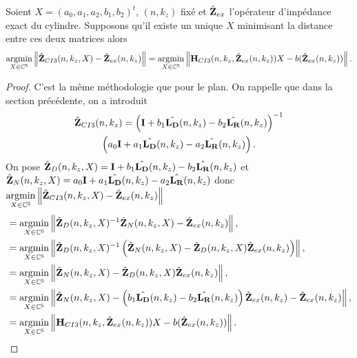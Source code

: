     \begin{prop}
      Soient \(X = (a_0,a_1,a_2,b_1,b_2)^t\), \((n,k_z)\) fixé et \(\hat{\mathbf{Z}}_{ex}\) l'opérateur d'impédance exact du cylindre.
      Supposons qu'il existe un unique \(X\) minimisant la distance entre ces deux matrices alors
      \begin{equation*}
        {\underset{X\in\mathbb C^5}{\operatorname{argmin}}} \left\lVert\hat{\mathbf{Z}}_{CI3}(n,k_z,X) - \hat{\mathbf{Z}}_{ex}(n,k_z)\right\rVert = {\underset{X\in\mathbb C^5}{\operatorname{argmin}}} \left\lVert\mathbf{H}_{CI3}(n,k_z,\hat{\mathbf{Z}}_{ex}(n,k_z))X - b(\hat{\mathbf{Z}}_{ex}(n,k_z))\right\rVert.
      \end{equation*}
    \end{prop}

    \begin{proof}
      C'est la même méthodologie que pour le plan.
      On rappelle que dans la section précédente, on a introduit
      \begin{multline*}
        \hat{\mathbf{Z}}_{CI3}(n,k_z) = \left(\mathbf{I} + b_1 \hat{\mathbf{L_D}}(n,k_z) - b_2 \hat{\mathbf{L_R}}(n,k_z) \right)^{-1}\\\left(a_0 \mathbf{I} + a_1 {\hat{\mathbf{L_D}}(n,k_z)} - a_2 {\hat{\mathbf{L_R}}(n,k_z)}\right).
      \end{multline*}
      On pose \(\hat{\mathbf{Z}}_D(n,k_z,X) = \mathbf{I} + b_1 \hat{\mathbf{L_D}}(n,k_z) - b_2 \hat{\mathbf{L_R}}(n,k_z)\) et \(\hat{\mathbf{Z}}_N(n,k_z,X) = a_0 \mathbf{I} + a_1 {\hat{\mathbf{L_D}}(n,k_z)} - a_2 {\hat{\mathbf{L_R}}(n,k_z)}\) donc \({\underset{X\in\mathbb C^5}{\operatorname{argmin}}} \left\lVert\hat{\mathbf{Z}}_{CI3}(n,k_z,X) - \hat{\mathbf{Z}}_{ex}(n,k_z)\right\rVert\)
      \begin{align*}
      & = {\underset{X\in\mathbb C^5}{\operatorname{argmin}}} \left\lVert\hat{\mathbf{Z}}_D(n,k_z,X)^{-1}\hat{\mathbf{Z}}_N(n,k_z,X) - \hat{\mathbf{Z}}_{ex}(n,k_z) \right\rVert,
      \\
      &= {\underset{X\in\mathbb C^5}{\operatorname{argmin}}} \left\lVert\hat{\mathbf{Z}}_D(n,k_z,X)^{-1}\left(\hat{\mathbf{Z}}_N(n,k_z,X) - \hat{\mathbf{Z}}_D(n,k_z,X)\hat{\mathbf{Z}}_{ex}(n,k_z)\right) \right\rVert,
      \\
      &= {\underset{X\in\mathbb C^5}{\operatorname{argmin}}} \left\lVert\hat{\mathbf{Z}}_N(n,k_z,X) - \hat{\mathbf{Z}}_D(n,k_z,X)\hat{\mathbf{Z}}_{ex}(n,k_z)\right\rVert,
      \\
      &= {\underset{X\in\mathbb C^5}{\operatorname{argmin}}} \left\lVert\hat{\mathbf{Z}}_N(n,k_z,X) - \left(b_1 \hat{\mathbf{L_D}}(n,k_z) - b_2 \hat{\mathbf{L_R}}(n,k_z)\right)\hat{\mathbf{Z}}_{ex}(n,k_z) - \hat{\mathbf{Z}}_{ex}(n,k_z) \right\rVert,
      \\
      &= {\underset{X\in\mathbb C^5}{\operatorname{argmin}}} \left\lVert\mathbf{H}_{CI3}(n,k_z,\hat{\mathbf{Z}}_{ex}(n,k_z))X - b(\hat{\mathbf{Z}}_{ex}(n,k_z))\right\rVert.
      \end{align*}
    \end{proof}

